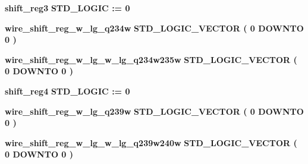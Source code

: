 \begin{DoxyCompactItemize}
\item 
{\bf shift\+\_\+reg3} {\bfseries \textcolor{comment}{S\+T\+D\+\_\+\+L\+O\+G\+IC}\textcolor{vhdlchar}{ }\textcolor{vhdlchar}{ }\textcolor{vhdlchar}{\+:}\textcolor{vhdlchar}{=}\textcolor{vhdlchar}{ }\textcolor{vhdlchar}{ }\textcolor{vhdlchar}{\textquotesingle{}}\textcolor{vhdlchar}{ } \textcolor{vhdldigit}{0} \textcolor{vhdlchar}{ }\textcolor{vhdlchar}{\textquotesingle{}}\textcolor{vhdlchar}{ }} 
\item 
{\bf wire\+\_\+shift\+\_\+reg\+\_\+w\+\_\+lg\+\_\+q234w} {\bfseries \textcolor{comment}{S\+T\+D\+\_\+\+L\+O\+G\+I\+C\+\_\+\+V\+E\+C\+T\+OR}\textcolor{vhdlchar}{ }\textcolor{vhdlchar}{(}\textcolor{vhdlchar}{ }\textcolor{vhdlchar}{ } \textcolor{vhdldigit}{0} \textcolor{vhdlchar}{ }\textcolor{keywordflow}{D\+O\+W\+N\+TO}\textcolor{vhdlchar}{ }\textcolor{vhdlchar}{ } \textcolor{vhdldigit}{0} \textcolor{vhdlchar}{ }\textcolor{vhdlchar}{)}\textcolor{vhdlchar}{ }} 
\item 
{\bf wire\+\_\+shift\+\_\+reg\+\_\+w\+\_\+lg\+\_\+w\+\_\+lg\+\_\+q234w235w} {\bfseries \textcolor{comment}{S\+T\+D\+\_\+\+L\+O\+G\+I\+C\+\_\+\+V\+E\+C\+T\+OR}\textcolor{vhdlchar}{ }\textcolor{vhdlchar}{(}\textcolor{vhdlchar}{ }\textcolor{vhdlchar}{ } \textcolor{vhdldigit}{0} \textcolor{vhdlchar}{ }\textcolor{keywordflow}{D\+O\+W\+N\+TO}\textcolor{vhdlchar}{ }\textcolor{vhdlchar}{ } \textcolor{vhdldigit}{0} \textcolor{vhdlchar}{ }\textcolor{vhdlchar}{)}\textcolor{vhdlchar}{ }} 
\item 
{\bf shift\+\_\+reg4} {\bfseries \textcolor{comment}{S\+T\+D\+\_\+\+L\+O\+G\+IC}\textcolor{vhdlchar}{ }\textcolor{vhdlchar}{ }\textcolor{vhdlchar}{\+:}\textcolor{vhdlchar}{=}\textcolor{vhdlchar}{ }\textcolor{vhdlchar}{ }\textcolor{vhdlchar}{\textquotesingle{}}\textcolor{vhdlchar}{ } \textcolor{vhdldigit}{0} \textcolor{vhdlchar}{ }\textcolor{vhdlchar}{\textquotesingle{}}\textcolor{vhdlchar}{ }} 
\item 
{\bf wire\+\_\+shift\+\_\+reg\+\_\+w\+\_\+lg\+\_\+q239w} {\bfseries \textcolor{comment}{S\+T\+D\+\_\+\+L\+O\+G\+I\+C\+\_\+\+V\+E\+C\+T\+OR}\textcolor{vhdlchar}{ }\textcolor{vhdlchar}{(}\textcolor{vhdlchar}{ }\textcolor{vhdlchar}{ } \textcolor{vhdldigit}{0} \textcolor{vhdlchar}{ }\textcolor{keywordflow}{D\+O\+W\+N\+TO}\textcolor{vhdlchar}{ }\textcolor{vhdlchar}{ } \textcolor{vhdldigit}{0} \textcolor{vhdlchar}{ }\textcolor{vhdlchar}{)}\textcolor{vhdlchar}{ }} 
\item 
{\bf wire\+\_\+shift\+\_\+reg\+\_\+w\+\_\+lg\+\_\+w\+\_\+lg\+\_\+q239w240w} {\bfseries \textcolor{comment}{S\+T\+D\+\_\+\+L\+O\+G\+I\+C\+\_\+\+V\+E\+C\+T\+OR}\textcolor{vhdlchar}{ }\textcolor{vhdlchar}{(}\textcolor{vhdlchar}{ }\textcolor{vhdlchar}{ } \textcolor{vhdldigit}{0} \textcolor{vhdlchar}{ }\textcolor{keywordflow}{D\+O\+W\+N\+TO}\textcolor{vhdlchar}{ }\textcolor{vhdlchar}{ } \textcolor{vhdldigit}{0} \textcolor{vhdlchar}{ }\textcolor{vhdlchar}{)}\textcolor{vhdlchar}{ }} 

\end{DoxyCompactItemize}
